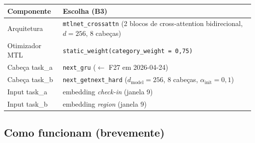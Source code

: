 \documentclass[11pt,a4paper]{article}
\begin{document}
\begin{table}[H]
\centering
\small
\begin{tabular}{ll}
\toprule
\textbf{Componente} & \textbf{Escolha (B3)} \\
\midrule
Arquitetura & \texttt{mtlnet\_crossattn} (2 blocos de cross-attention bidirecional, $d=256$, 8 cabeças) \\
Otimizador MTL & \texttt{static\_weight(category\_weight = 0{,}75)} \\
Cabeça task\_a & \texttt{next\_gru} ($\leftarrow$ F27 em 2026-04-24) \\
Cabeça task\_b & \texttt{next\_getnext\_hard} ($d_\text{model}=256$, 8 cabeças, $\alpha_\text{init}=0{,}1$) \\
Input task\_a & embedding \emph{check-in} (janela 9) \\
Input task\_b & embedding \emph{region} (janela 9) \\
\bottomrule
\end{tabular}
\end{table}

\subsection*{Como funcionam (brevemente)}
\end{document}
